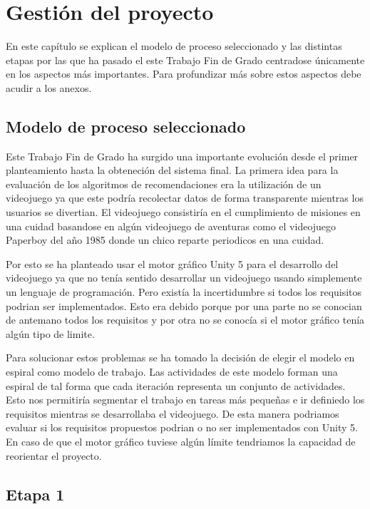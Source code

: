 \chapter{Gestión del proyecto}
\thispagestyle{empty}

En este capítulo se explican el modelo de proceso seleccionado y las distintas etapas por las que ha pasado el este Trabajo Fin de Grado centradose únicamente en los aspectos más importantes. Para profundizar más sobre estos aspectos debe acudir a los anexos.

\section{Modelo de proceso seleccionado}
\thispagestyle{empty}

Este Trabajo Fin de Grado ha surgido una importante evolución desde el primer planteamiento hasta la obteneción del sistema final. La primera idea para la evaluación de los algoritmos de recomendaciones era la utilización de un videojuego ya que este podría recolectar datos de forma transparente mientras los usuarios se divertian. El videojuego consistiría en el cumplimiento de misiones en una cuidad basandose en algún videojuego de aventuras como el videojuego Paperboy del año 1985 donde un chico reparte periodicos en una cuidad.

Por esto se ha planteado usar el motor gráfico Unity 5 para el desarrollo del videojuego ya que no tenía sentido desarrollar un videojuego usando simplemente un lenguaje de programación. Pero existía la incertidumbre si todos los requisitos podrian ser implementados. Esto era debido porque por una parte no se conocian de antemano todos los requisitos y por otra no se conocía si el motor gráfico tenía algún tipo de limite. 

Para solucionar estos problemas se ha tomado la decisión de elegir el modelo en espiral como modelo de trabajo. Las actividades de este modelo forman una espiral de tal forma que cada iteración representa un conjunto de actividades. Esto nos permitiría segmentar el trabajo en tareas más pequeñas e ir definiedo los requisitos mientras se desarrollaba el videojuego. De esta manera podriamos evaluar si los requisitos propuestos podrian o no ser implementados con Unity 5. En caso de que el motor gráfico tuviese algún límite tendriamos la capacidad de reorientar el proyecto.

\section{Etapa 1}
\thispagestyle{empty}

